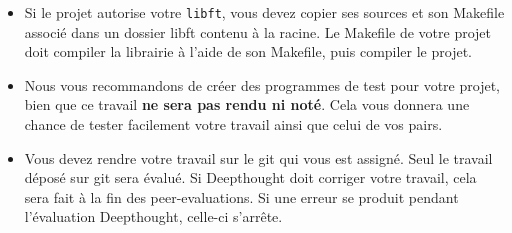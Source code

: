 \begin{itemize}
      \item Si le projet autorise votre \texttt{libft}, vous devez copier ses sources et 
        son Makefile associé dans un dossier libft contenu à la racine.
        Le Makefile de votre projet doit compiler la librairie à l'aide de son Makefile,
        puis compiler le projet.

      \item Nous vous recommandons de créer des programmes de test pour votre projet,
        bien que ce travail \textbf{ne sera pas rendu ni noté}. Cela vous donnera une chance
        de tester facilement votre travail ainsi que celui de vos pairs. 

      \item Vous devez rendre votre travail sur le git qui vous est assigné. Seul le travail
        déposé sur git sera évalué. Si Deepthought doit corriger votre travail, cela sera fait
        à la fin des peer-evaluations.
        Si une erreur se produit pendant l'évaluation Deepthought, celle-ci s'arrête.
    \end{itemize}
